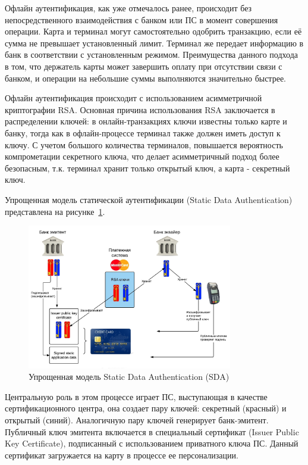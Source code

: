 Офлайн аутентификация, как уже отмечалось ранее, происходит без непосредственного взаимодействия с банком или ПС в момент совершения операции.
Карта и терминал могут самостоятельно одобрить транзакцию, если её сумма не превышает установленный лимит.
Терминал же передает информацию в банк в соответствии с установленным режимом.
Преимущества данного подхода в том, что держатель карты может завершить оплату при отсутствии связи с банком, и операции на небольшие суммы выполняются значительно быстрее.

Офлайн аутентификация происходит с использованием асимметричной криптографии RSA.
Основная причина использования RSA заключается в распределении ключей: в онлайн-транзакциях ключи известны только карте и банку, тогда как в офлайн-процессе терминал также должен иметь доступ к ключу.
С учетом большого количества терминалов, повышается вероятность компрометации секретного ключа, что делает асимметричный подход более безопасным, т.к. терминал хранит только открытый ключ, а карта - секретный ключ.

Упрощенная модель статической аутентификации (Static Data Authentication) представлена на рисунке~\ref{fig:sda}.

\begin{figure}[H]
    \centering
    \includegraphics[width=0.8\textwidth]{images/research/sda}
    \caption{\centering Упрощенная модель Static Data Authentication (SDA)}
    \label{fig:sda}
\end{figure}

Центральную роль в этом процессе играет ПС, выступающая в качестве сертификационного центра, она создает пару ключей: секретный (красный) и открытый (синий).
Аналогичную пару ключей генерирует банк-эмитент.
Публичный ключ эмитента включается в специальный сертификат (Issuer Public Key Certificate), подписанный с использованием приватного ключа ПС.
Данный сертификат загружается на карту в процессе ее персонализации.

